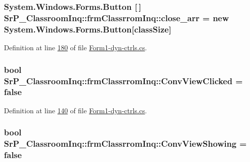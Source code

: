 \hypertarget{class_sr_p___classroom_inq_1_1frm_classrrom_inq_a4758f35d344b79b972e88a42cb660904}{
\subsubsection[{close\-\_\-arr}]{\setlength{\rightskip}{0pt plus 5cm}\-System.\-Windows.\-Forms.\-Button \mbox{[}$\,$\mbox{]} {\bf \-Sr\-P\-\_\-\-Classroom\-Inq\-::frm\-Classrrom\-Inq\-::close\-\_\-arr} = new \-System.\-Windows.\-Forms.\-Button\mbox{[}{\bf class\-Size}\mbox{]}}}
\label{class_sr_p___classroom_inq_1_1frm_classrrom_inq_a4758f35d344b79b972e88a42cb660904}


\-Definition at line \hyperlink{_form1-dyn-ctrls_8cs_source_l00180}{180} of file \hyperlink{_form1-dyn-ctrls_8cs_source}{\-Form1-\/dyn-\/ctrls.\-cs}.

\hypertarget{class_sr_p___classroom_inq_1_1frm_classrrom_inq_a567cf412a542927bb47984c0e835a7d2}{
\subsubsection[{\-Conv\-View\-Clicked}]{\setlength{\rightskip}{0pt plus 5cm}bool {\bf \-Sr\-P\-\_\-\-Classroom\-Inq\-::frm\-Classrrom\-Inq\-::\-Conv\-View\-Clicked} = false}}
\label{class_sr_p___classroom_inq_1_1frm_classrrom_inq_a567cf412a542927bb47984c0e835a7d2}


\-Definition at line \hyperlink{_form1-dyn-ctrls_8cs_source_l00140}{140} of file \hyperlink{_form1-dyn-ctrls_8cs_source}{\-Form1-\/dyn-\/ctrls.\-cs}.

\hypertarget{class_sr_p___classroom_inq_1_1frm_classrrom_inq_a5b2fbbaa361339e096aa4be3f8e2b2dd}{
\subsubsection[{\-Conv\-View\-Showing}]{\setlength{\rightskip}{0pt plus 5cm}bool {\bf \-Sr\-P\-\_\-\-Classroom\-Inq\-::frm\-Classrrom\-Inq\-::\-Conv\-View\-Showing} = false}}
\label{class_sr_p___classroom_inq_1_1frm_classrrom_inq_a5b2fbbaa361339e096aa4be3f8e2b2dd}


